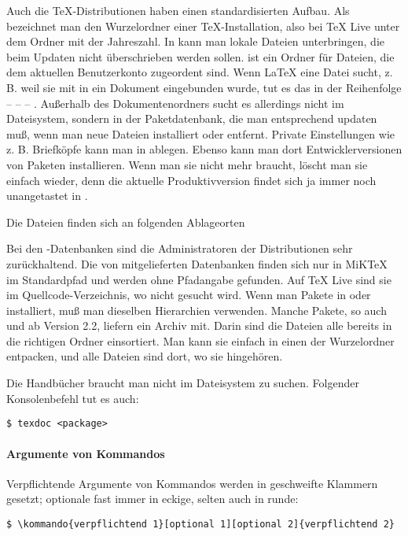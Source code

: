 \documentclass[12pt,table]{scrreprt}
\begin{document}
Auch die \TeX-Distributionen haben einen standardisierten Aufbau. Als  bezeichnet man den Wurzelordner einer \TeX-Installation, also bei \TeX{} Live unter dem Ordner mit der Jahreszahl. In  kann man lokale Dateien unterbringen, die beim Updaten nicht überschrieben werden sollen.  ist ein Ordner für Dateien, die dem aktuellen Benutzerkonto zugeordent sind. Wenn \LaTeX{} eine Datei sucht, z. B. weil sie mit  in ein Dokument eingebunden wurde, tut es das in der Reihenfolge  –  –  – . Außerhalb des Dokumentenordners sucht es allerdings nicht im Dateisystem, sondern in der Paketdatenbank, die man entsprechend updaten muß, wenn man neue Dateien installiert oder entfernt. Private Einstellungen wie z. B. Briefköpfe kann man in  ablegen. Ebenso kann man dort Entwicklerversionen von Paketen installieren. Wenn man sie nicht mehr braucht, löscht man sie einfach wieder, denn die aktuelle Produktivversion findet sich ja immer noch unangetastet in .

Die Dateien finden sich an folgenden Ablageorten

Bei den \BibTeX-Datenbanken sind die Administratoren der Distributionen sehr zurückhaltend. Die von \archbib mitgelieferten Datenbanken finden sich nur in MiK\TeX{} im Standardpfad und werden ohne Pfadangabe gefunden. Auf \TeX{} Live sind sie im Quellcode-Verzeichnis, wo nicht gesucht wird. Wenn man Pakete in  oder  installiert, muß man dieselben Hierarchien verwenden. Manche Pakete, so auch \blx und \archbib ab Version 2.2, liefern ein Archiv  mit. Darin sind die Dateien alle bereits in die richtigen Ordner einsortiert. Man kann sie einfach in einen der Wurzelordner entpacken, und alle Dateien sind dort, wo sie hingehören.

Die Handbücher braucht man nicht im Dateisystem zu suchen. Folgender Konsolenbefehl tut es auch:
\begin{Verbatim}
$ texdoc <package>
\end{Verbatim}

\paragraph{Argumente von Kommandos}
Verpflichtende Argumente von Kommandos werden in geschweifte Klammern gesetzt; optionale fast immer in eckige, selten auch in runde:
\begin{Verbatim}
$ \kommando{verpflichtend 1}[optional 1][optional 2]{verpflichtend 2}
\end{Verbatim}
\end{document}
